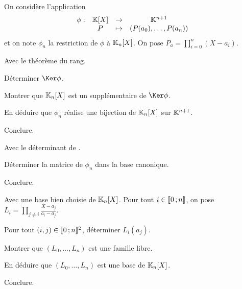 \begin{exercice}
On considère l'application
\[
\begin{array}{lccc}
\phi : & \mathbb{K}[X] &\to& \mathbb{K}^{n+1}\\
&P&\mapsto&(P(a_0),\ldots,P(a_n))
\end{array}
\]
et on note $\phi_n$ la restriction de $\phi$ à $\mathbb{K}_n[X]$. On pose $P_a = \prod\limits_{i=0}^n (X - a_i)$.
\begin{questions}
\item Avec le théorème du rang.
\begin{questions}
\item Déterminer $\Ker \phi$.

\item Montrer que $\mathbb{K}_n[X]$ est un supplémentaire de $\Ker \phi$.

\item En déduire que $\phi_n$ réalise une bijection de $\mathbb{K}_n[X]$ sur $\mathbb{K}^{n+1}$.

\item Conclure.
\end{questions}

\item Avec le déterminant de .
\begin{questions}
\item Déterminer la matrice de $\phi_n$ dans la base canonique.

\item Conclure.
\end{questions}

\item Avec une base bien choisie de $\mathbb{K}_n[X]$. Pour tout $i \in \llbracket 0\,; n \rrbracket$, on pose $L_i = \prod\limits_{j \neq i} \frac{X - a_j}{a_i - a_j}$.
\begin{questions}
\item Pour tout $(i, j) \in \llbracket 0\,; n \rrbracket^2$, déterminer $L_i(a_j)$.

\item Montrer que $(L_0,\ldots,L_n)$ est une famille libre.

\item En déduire que $(L_0,\ldots,L_n)$ est une base de $\mathbb{K}_n[X]$.

\item Conclure.
\end{questions}
\end{questions}
\end{exercice}

